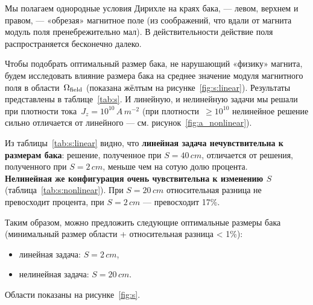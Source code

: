 Мы полагаем однородные условия Дирихле на краях бака, --- левом, верхнем и правом, --- «обрезая» магнитное поле (из соображений, что вдали от магнита модуль поля пренебрежительно мал). В действительности действие поля распространяется бесконечно далеко. 

Чтобы подобрать оптимальный размер бака, не нарушающий «физику» магнита, будем исследовать влияние размера бака на среднее значение модуля магнитного поля в области~${\Omega_{\text{field}}}$ (показана жёлтым на рисунке~\ref{fig:s:linear}). Результаты представлены в таблице~\ref{tab:s}. И линейную, и нелинейную задачи мы решали при плотности тока~${J_z = 10^{10}\,A\,m^{-2}}$ (при плотности~$\ge 10^{10}$ нелинейное решение сильно отличается от линейного --- см. рисунок~\ref{fig:a_nonlinear}). 

Из таблицы~\ref{tab:s:linear} видно, что \textbf{линейная задача нечувствительна к размерам бака}: решение, полученное при $S = 40\,cm$, отличается от решения, полученного при $S = 2\,cm$, меньше чем на сотую долю процента. \\
\textbf{Нелинейная же конфигурация очень чувствительна к изменению $S$} (таблица~\ref{tab:s:nonlinear}). При $S = 20\,cm$ относительная разница не превосходит процента, при $S = 2\,cm$ --- превосходит 17\%.

Таким образом, можно предложить следующие оптимальные размеры бака (минимальный размер области + относительная разница < 1\%):
\begin{itemize}
	\item линейная задача: $S = 2\,cm$,
	\item нелинейная задача: $S = 20\,cm$.
\end{itemize} 
Области показаны на рисунке~\ref{fig:s}.


